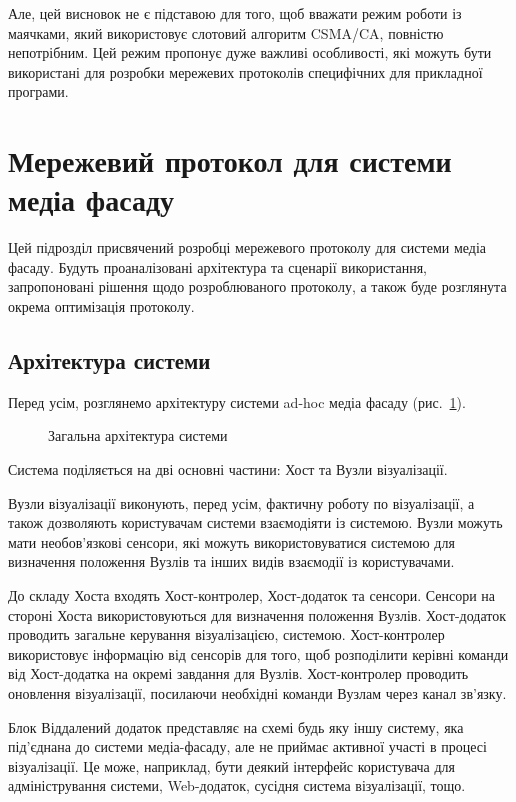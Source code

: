 \documentclass[a4paper,ukrainian,utf8,nocolumnsxix,floatsection]{eskdtext}
\let\stdsection\section
\renewcommand\section{\clearpage\stdsection}
\newcommand{\figref}[1]{рис.~\ref{#1}}
\newcommand{\csma}[0]{CSMA/CA\xspace}
\begin{document}
Але, цей висновок не є підставою для того, щоб вважати режим роботи із маячками, який використовує слотовий алгоритм \csma, повністю непотрібним. Цей режим пропонує дуже важливі особливості, які можуть бути використані для розробки мережевих протоколів специфічних для прикладної програми.

\section{Мережевий протокол для системи медіа фасаду}
\label{sec:network:protocol:amf}


Цей підрозділ присвячений розробці мережевого протоколу для системи медіа фасаду. Будуть проаналізовані архітектура та сценарії використання, запропоновані рішення щодо розроблюваного протоколу, а також буде розглянута окрема оптимізація протоколу.

\subsection{Архітектура системи}
\label{sub:system:arch}

Перед усім, розглянемо архітектуру системи ad-hoc медіа фасаду (\figref{fig:sys_arch}). 

\begin{figure}[bth]
\centering
{}
\caption{\label{fig:sys_arch}Загальна архітектура системи}
\end{figure}

Система поділяється на дві основні частини: Хост та Вузли візуалізації.

Вузли візуалізації виконують, перед усім, фактичну роботу по візуалізації, а також дозволяють користувачам системи взаємодіяти із системою. Вузли можуть мати необов’язкові сенсори, які можуть використовуватися системою для визначення положення Вузлів та інших видів взаємодії із користувачами.

До складу Хоста входять Хост-контролер, Хост-додаток та сенсори. Сенсори на стороні Хоста використовуються для визначення положення Вузлів. Хост-додаток проводить загальне керування візуалізацією, системою. Хост-контролер використовує інформацію від сенсорів для того, щоб розподілити керівні команди від Хост-додатка на окремі завдання для Вузлів. Хост-контролер проводить оновлення візуалізації, посилаючи необхідні команди Вузлам через канал зв’язку.

Блок Віддалений додаток представляє на схемі будь яку іншу систему, яка під’єднана до системи медіа-фасаду, але не приймає активної участі в процесі візуалізації. Це може, наприклад, бути деякий інтерфейс користувача для адміністрування системи, Web-додаток, сусідня система візуалізації, тощо.
\end{document}
